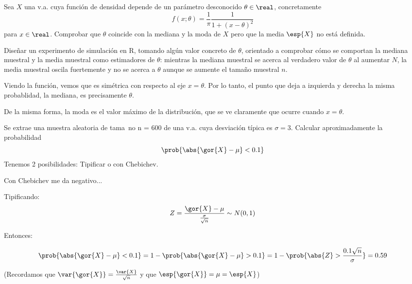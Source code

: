 \begin{problem}[5] Sea $X$ una v.a. cuya función de densidad depende de un parámetro desconocido $\theta \in \real$, concretamente \[ f(x;\theta) = \frac{1}{\pi}\frac{1}{1+(x-\theta)^2} \] para $x\in \real$. Comprobar que $\theta$ coincide con la mediana y la moda de $X$ pero que la media $\esp{X}$ no está definida.

Diseñar un experimento de simulación en R, tomando algún valor concreto de $\theta$, orientado a comprobar cómo se comportan la mediana muestral y la media muestral como estimadores de $\theta$: mientras la mediana muestral se acerca al verdadero valor de $\theta$ al aumentar $N$, la media muestral oscila fuertemente y no se acerca a $\theta$ aunque se aumente el tamaño muestral $n$.

\solution Viendo la función, vemos que es simétrica con respecto al eje $x= \theta$. Por lo tanto, el punto que deja a izquierda y derecha la misma probablidad, la mediana, es precisamente $\theta$. 

De la misma forma, la moda es el valor máximo de la distribución, que se ve claramente que ocurre cuando $x=\theta$.
\end{problem}

\begin{problem}[6]
Se extrae una muestra aleatoria de tama~no n = 600 de una v.a. cuya desviación típica es $\sigma = 3$.
Calcular aproximadamente la probabilidad \[\prob{\abs{\gor{X} - \mu} < 0.1}\]
\solution
Tenemos 2 posibilidades: Tipificar o con Chebichev.

Con Chebichev me da negativo... 

Tipificando: \[Z = \frac{\gor{X} - \mu}{\frac{\sigma}{\sqrt{n}}} \sim N(0,1)\]

Entonces:

\[\prob{\abs{\gor{X} - \mu} < 0.1} = 1- \prob{\abs{\gor{X} - \mu} > 0.1} = 1 - \prob{\abs{Z} > \frac{0.1\sqrt{n}}{\sigma}} = 0.59\] 

(Recordamos que $\var{\gor{X}} = \frac{\var{X}}{\sqrt{n}}$ y que $\esp{\gor{X}} = \mu = \esp{X}$)

\end{problem}

